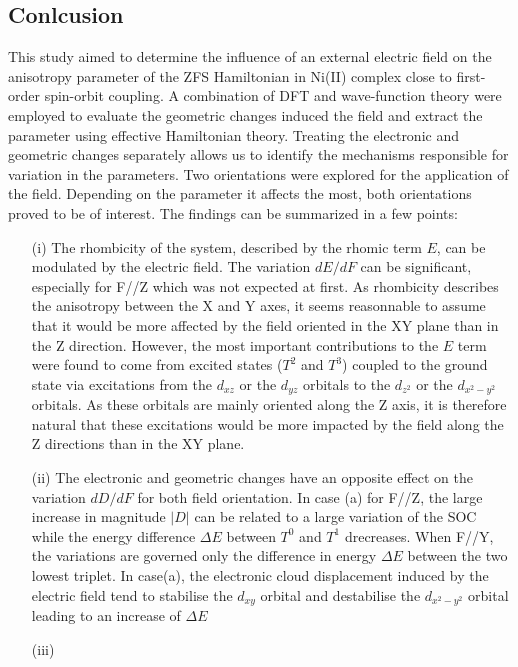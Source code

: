 \documentclass[10pt]{report}
\numberwithin{equation}{section}
\begin{document}
\newpage
\subsection{Conlcusion}

This study aimed to determine the influence of an external electric field on the anisotropy parameter of the ZFS Hamiltonian in Ni(II) complex close to first-order spin-orbit coupling. 
A combination of DFT and wave-function theory were employed to evaluate the geometric changes induced the field and extract the parameter using effective Hamiltonian theory.
Treating the electronic and geometric changes separately allows us to identify the mechanisms responsible for variation in the parameters.
Two orientations were explored for the application of the field. Depending on the parameter it affects the most, both orientations proved to be of interest.
The findings can be summarized in a few points:

\begin{itemize}
    \item[(i)] The rhombicity of the system, described by the rhomic term $E$, can be modulated by the electric field. 
    The variation $dE/dF$ can be significant, especially for F//Z which was not expected at first.
    As rhombicity describes the anisotropy between the X and Y axes, it seems reasonnable to assume that it would be more affected by the field oriented in the XY plane than in the Z direction.
    However, the most important contributions to the $E$ term were found to come from excited states ($T^2$ and $T^3$) coupled to the ground state via excitations from the $d_{xz}$ or the $d_{yz}$ orbitals to the $d_{z^2}$ or the $d_{x^2-y^2}$ orbitals.
    As these orbitals are mainly oriented along the Z axis, it is therefore natural that these excitations would be more impacted by the field along the Z directions than in the XY plane.
    \item[(ii)] The electronic and geometric changes have an opposite effect on the variation $dD/dF$ for both field orientation. 
    In case (a) for F//Z, the large increase in magnitude $|D|$ can be related to a large variation of the SOC while the energy difference $\Delta E$ between $T^0$ and $T^1$ drecreases.
    When F//Y, the variations are governed only the difference in energy $\Delta E$ between the two lowest triplet. 
    In case(a), the electronic cloud displacement induced by the electric field tend to stabilise the $d_{xy}$ orbital and destabilise the $d_{x^2-y^2}$ orbital leading to an increase of $\Delta E$
    \item[(iii)] 
\end{itemize}
\end{document}
